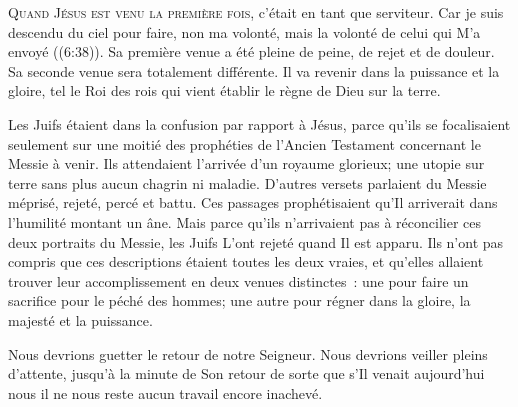 




\lettrine{Q}{uand Jésus est venu la première fois,}
 c'était en tant que serviteur.
 \og Car je suis descendu du ciel pour faire, non ma volonté,
 mais la volonté de celui qui M'a envoyé \fg{} ((6:38)).
 Sa première venue a été pleine de peine, de rejet et de douleur.
 Sa seconde venue sera totalement différente.
 Il va revenir dans la puissance et la gloire, tel
 \og le  Roi des rois \fg{} 
 qui vient établir le règne de Dieu sur la terre.

Les Juifs étaient dans la confusion par rapport à Jésus,
 parce qu'ils se focalisaient seulement sur une moitié des prophéties
 de l'Ancien Testament concernant le Messie à venir.
 Ils attendaient l'arrivée d'un royaume glorieux;
 une utopie sur terre sans plus aucun chagrin ni maladie.
 D'autres versets parlaient du Messie méprisé, rejeté, percé et battu.
 Ces passages prophétisaient qu'Il arriverait dans l'humilité montant un âne.
 Mais parce qu'ils n'arrivaient pas à réconcilier ces deux portraits
 du Messie, les Juifs L'ont rejeté quand Il est apparu.
 Ils n'ont pas compris que ces descriptions étaient toutes les deux vraies,
 et qu'elles allaient trouver leur accomplissement en deux venues distinctes~:
 une pour faire un sacrifice pour le péché des hommes;
 une autre pour régner dans la gloire, la majesté et la puissance.


Nous devrions guetter le retour de notre Seigneur.
 Nous devrions veiller pleins d'attente, jusqu'à la minute de Son retour
 \ocadr de sorte que s'Il venait aujourd'hui
 nous il ne nous reste aucun travail encore inachevé.

\dvrule



